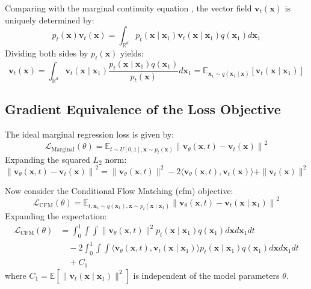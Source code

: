 Comparing  with the marginal continuity equation , the vector field $\mathbf{v}_t(\mathbf{x})$ is uniquely determined by:
\begin{equation}
    p_t(\mathbf{x}) \mathbf{v}_t(\mathbf{x}) = \int_{\mathbb{R}^d} p_t(\mathbf{x} \mid \mathbf{x}_1) \mathbf{v}_t(\mathbf{x} \mid \mathbf{x}_1) q(\mathbf{x}_1) d\mathbf{x}_1
    \label{eq:app_marginal_vector_field}
\end{equation}
Dividing both sides by $p_t(\mathbf{x})$ yields:
\begin{equation}
    \mathbf{v}_t(\mathbf{x}) = \int_{\mathbb{R}^d} \mathbf{v}_t(\mathbf{x} \mid \mathbf{x}_1) \frac{p_t(\mathbf{x} \mid \mathbf{x}_1) q(\mathbf{x}_1)}{p_t(\mathbf{x})} d\mathbf{x}_1 = \mathbb{E}_{\mathbf{x}_1 \sim q(\mathbf{x}_1 \mid \mathbf{x})} \left[ \mathbf{v}_t(\mathbf{x} \mid \mathbf{x}_1) \right]
    \label{eq:app_vector_expectation}
\end{equation}

\subsection{Gradient Equivalence of the Loss Objective}
The ideal marginal regression loss is given by:
\begin{equation}
    \mathcal{L}_{\text{Marginal}}(\theta) = \mathbb{E}_{t \sim U[0, 1], \mathbf{x} \sim p_t(\mathbf{x})} \left\| \mathbf{v}_\theta(\mathbf{x}, t) - \mathbf{v}_t(\mathbf{x}) \right\|^2
    \label{eq:app_marginal_loss}
\end{equation}
Expanding the squared $L_2$ norm:
\begin{equation}
    \left\| \mathbf{v}_\theta(\mathbf{x}, t) - \mathbf{v}_t(\mathbf{x}) \right\|^2 = \|\mathbf{v}_\theta(\mathbf{x}, t)\|^2 - 2 \langle \mathbf{v}_\theta(\mathbf{x}, t), \mathbf{v}_t(\mathbf{x}) \rangle + \|\mathbf{v}_t(\mathbf{x})\|^2
    \label{eq:app_norm_expansion}
\end{equation}

Now consider the Conditional Flow Matching (\acrshort{cfm}) objective:
\begin{equation}
    \mathcal{L}_{\text{CFM}}(\theta) = \mathbb{E}_{t, \mathbf{x}_1 \sim q(\mathbf{x}_1), \mathbf{x} \sim p_t(\mathbf{x} \mid \mathbf{x}_1)} \left\| \mathbf{v}_\theta(\mathbf{x}, t) - \mathbf{v}_t(\mathbf{x} \mid \mathbf{x}_1) \right\|^2
    \label{eq:app_cfm_loss}
\end{equation}
Expanding the expectation:
\begin{align}
    \mathcal{L}_{\text{CFM}}(\theta) &= \int_0^1 \int \int \|\mathbf{v}_\theta(\mathbf{x}, t)\|^2 p_t(\mathbf{x} \mid \mathbf{x}_1) q(\mathbf{x}_1) d\mathbf{x} d\mathbf{x}_1 dt \nonumber \\
    &\quad - 2 \int_0^1 \int \int \langle \mathbf{v}_\theta(\mathbf{x}, t), \mathbf{v}_t(\mathbf{x} \mid \mathbf{x}_1) \rangle p_t(\mathbf{x} \mid \mathbf{x}_1) q(\mathbf{x}_1) d\mathbf{x} d\mathbf{x}_1 dt \nonumber \\
    &\quad + C_1
    \label{eq:app_cfm_integral}
\end{align}
where $C_1 = \mathbb{E}[\|\mathbf{v}_t(\mathbf{x} \mid \mathbf{x}_1)\|^2]$ is independent of the model parameters $\theta$.

